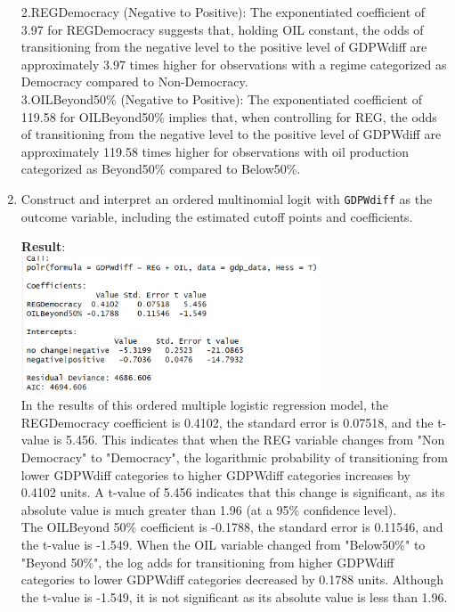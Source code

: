 \documentclass[12pt,letterpaper]{article}
\begin{document}
\begin{enumerate}
	2.REGDemocracy (Negative to Positive): The exponentiated coefficient of 3.97 for REGDemocracy suggests that, holding OIL constant, the odds of transitioning from the negative level to the positive level of GDPWdiff are approximately 3.97 times higher for observations with a regime categorized as Democracy compared to Non-Democracy. \\
	
	3.OILBeyond50\% (Negative to Positive): The exponentiated coefficient of 119.58 for OILBeyond50\% implies that, when controlling for REG, the odds of transitioning from the negative level to the positive level of GDPWdiff are approximately 119.58 times higher for observations with oil production categorized as Beyond50\% compared to Below50\%.\\
	
	\item Construct and interpret an ordered multinomial logit with \texttt{GDPWdiff} as the outcome variable, including the estimated cutoff points and coefficients.
	 
	\textbf{Result}:\\
	\includegraphics[width=0.7\textwidth]{Q1_3.png}\\
	In the results of this ordered multiple logistic regression model, the REGDemocracy coefficient is 0.4102, the standard error is 0.07518, and the t-value is 5.456. This indicates that when the REG variable changes from "Non Democracy" to "Democracy", the logarithmic probability of transitioning from lower GDPWdiff categories to higher GDPWdiff categories increases by 0.4102 units. A t-value of 5.456 indicates that this change is significant, as its absolute value is much greater than 1.96 (at a 95\% confidence level).\\
	
	The OILBeyond 50\% coefficient is -0.1788, the standard error is 0.11546, and the t-value is -1.549. When the OIL variable changed from "Below50\%" to "Beyond 50\%", the log adds for transitioning from higher GDPWdiff categories to lower GDPWdiff categories decreased by 0.1788 units. Although the t-value is -1.549, it is not significant as its absolute value is less than 1.96.\\
	

\end{enumerate}
\end{document}
